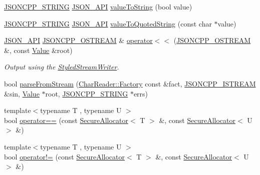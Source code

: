 \begin{DoxyCompactItemize}
\item 
\hyperlink{config_8h_a1e723f95759de062585bc4a8fd3fa4be}{J\+S\+O\+N\+C\+P\+P\+\_\+\+S\+T\+R\+I\+NG} \hyperlink{config_8h_a1d61ffde86ce1a18fd83194ff0d9a206}{J\+S\+O\+N\+\_\+\+A\+PI} \hyperlink{namespace_json_aed05b7acd30f7442fe36b24c7abd10b9}{value\+To\+String} (bool value)
\item 
\hyperlink{config_8h_a1e723f95759de062585bc4a8fd3fa4be}{J\+S\+O\+N\+C\+P\+P\+\_\+\+S\+T\+R\+I\+NG} \hyperlink{config_8h_a1d61ffde86ce1a18fd83194ff0d9a206}{J\+S\+O\+N\+\_\+\+A\+PI} \hyperlink{namespace_json_a19a9262b788aa2754d3931e7cd01f2fc}{value\+To\+Quoted\+String} (const char $\ast$value)
\item 
\hyperlink{config_8h_a1d61ffde86ce1a18fd83194ff0d9a206}{J\+S\+O\+N\+\_\+\+A\+PI} \hyperlink{config_8h_a37a25be5fca174927780caeb280094ce}{J\+S\+O\+N\+C\+P\+P\+\_\+\+O\+S\+T\+R\+E\+AM} \& \hyperlink{namespace_json_a845a15902e500af8eee19e729a17b863}{operator$<$$<$} (\hyperlink{config_8h_a37a25be5fca174927780caeb280094ce}{J\+S\+O\+N\+C\+P\+P\+\_\+\+O\+S\+T\+R\+E\+AM} \&, const \hyperlink{class_json_1_1_value}{Value} \&root)
\begin{DoxyCompactList}\small\item\em Output using the \hyperlink{class_json_1_1_styled_stream_writer}{Styled\+Stream\+Writer}. \end{DoxyCompactList}\item 
bool \hyperlink{namespace_json_a38f903cfdb57a6c4e86a7dcc42f3712c}{parse\+From\+Stream} (\hyperlink{class_json_1_1_char_reader_1_1_factory}{Char\+Reader\+::\+Factory} const \&fact, \hyperlink{config_8h_a15f2f70b2ce0a2abd0f8112393dbc4de}{J\+S\+O\+N\+C\+P\+P\+\_\+\+I\+S\+T\+R\+E\+AM} \&sin, \hyperlink{class_json_1_1_value}{Value} $\ast$root, \hyperlink{config_8h_a1e723f95759de062585bc4a8fd3fa4be}{J\+S\+O\+N\+C\+P\+P\+\_\+\+S\+T\+R\+I\+NG} $\ast$errs)
\item 
{\footnotesize template$<$typename T , typename U $>$ }\\bool \hyperlink{namespace_json_a85a761cd8643a538387c0fe37bb937e8}{operator==} (const \hyperlink{class_json_1_1_secure_allocator}{Secure\+Allocator}$<$ T $>$ \&, const \hyperlink{class_json_1_1_secure_allocator}{Secure\+Allocator}$<$ U $>$ \&)
\item 
{\footnotesize template$<$typename T , typename U $>$ }\\bool \hyperlink{namespace_json_a86063654ac54c5e00f2f559f2c363b4e}{operator!=} (const \hyperlink{class_json_1_1_secure_allocator}{Secure\+Allocator}$<$ T $>$ \&, const \hyperlink{class_json_1_1_secure_allocator}{Secure\+Allocator}$<$ U $>$ \&)
\end{DoxyCompactItemize}


